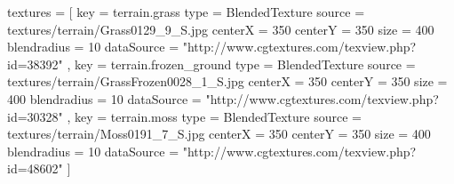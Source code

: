 textures = [
    {
        key         = terrain.grass
        type        = BlendedTexture
        source      = textures/terrain/Grass0129_9_S.jpg
        centerX     = 350
        centerY     = 350
        size        = 400
        blendradius = 10
        dataSource  = "http://www.cgtextures.com/texview.php?id=38392"
    }, {
        key         = terrain.frozen_ground
        type        = BlendedTexture
        source      = textures/terrain/GrassFrozen0028_1_S.jpg
        centerX     = 350
        centerY     = 350
        size        = 400
        blendradius = 10
        dataSource  = "http://www.cgtextures.com/texview.php?id=30328"
    }, {
        key         = terrain.moss
        type        = BlendedTexture
        source      = textures/terrain/Moss0191_7_S.jpg
        centerX     = 350
        centerY     = 350
        size        = 400
        blendradius = 10
        dataSource  = "http://www.cgtextures.com/texview.php?id=48602"
    }
]

